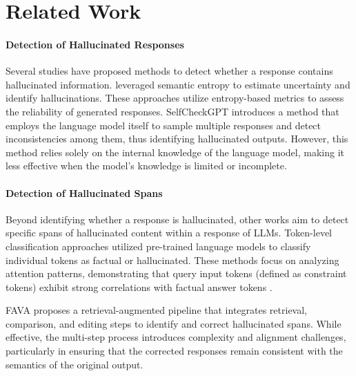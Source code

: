 \section{Related Work}

\paragraph{Detection of Hallucinated Responses} Several studies have proposed methods to detect whether a response contains hallucinated information. \citet{Farquhar2024Detecting, han2024semantic, arteaga2024hallucination} leveraged semantic entropy \cite{kuhn2023semantic} to estimate uncertainty and identify hallucinations. These approaches utilize entropy-based metrics to assess the reliability of generated responses.
SelfCheckGPT \cite{manakul-etal-2023-selfcheckgpt} introduces a method that employs the language model itself to sample multiple responses and detect inconsistencies among them, thus identifying hallucinated outputs. However, this method relies solely on the internal knowledge of the language model, making it less effective when the model's knowledge is limited or incomplete.

\paragraph{Detection of Hallucinated Spans} Beyond identifying whether a response is hallucinated, other works aim to detect specific spans of hallucinated content within a response of LLMs. Token-level classification approaches \cite{liu-etal-2022-token} utilized pre-trained language models to classify individual tokens as factual or hallucinated. These methods focus on analyzing attention patterns, demonstrating that query input tokens (defined as constraint tokens) exhibit strong correlations with factual answer tokens \cite{yuksekgonul2024attention}.

FAVA \cite{mishra2024finegrained-FAVA} proposes a retrieval-augmented pipeline that integrates retrieval, comparison, and editing steps to identify and correct hallucinated spans. While effective, the multi-step process introduces complexity and alignment challenges, particularly in ensuring that the corrected responses remain consistent with the semantics of the original output.

